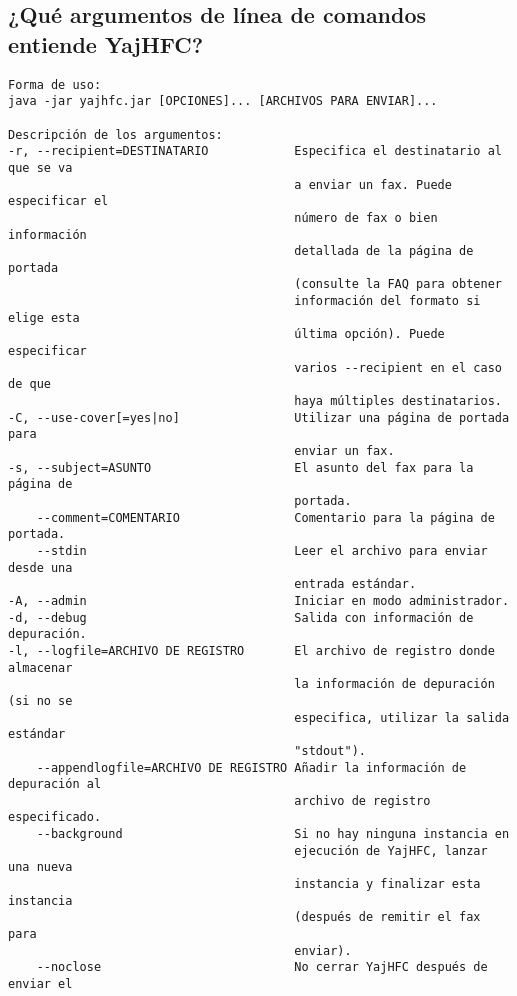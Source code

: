 \documentclass[a4paper,10pt]{scrartcl}
\begin{document}
\subsection{¿Qué argumentos de línea de comandos entiende YajHFC?}

\begin{verbatim}
Forma de uso:
java -jar yajhfc.jar [OPCIONES]... [ARCHIVOS PARA ENVIAR]...

Descripción de los argumentos:
-r, --recipient=DESTINATARIO            Especifica el destinatario al que se va
                                        a enviar un fax. Puede especificar el
                                        número de fax o bien información
                                        detallada de la página de portada
                                        (consulte la FAQ para obtener
                                        información del formato si elige esta
                                        última opción). Puede especificar
                                        varios --recipient en el caso de que
                                        haya múltiples destinatarios.
-C, --use-cover[=yes|no]                Utilizar una página de portada para
                                        enviar un fax.
-s, --subject=ASUNTO                    El asunto del fax para la página de
                                        portada.
    --comment=COMENTARIO                Comentario para la página de portada.
    --stdin                             Leer el archivo para enviar desde una
                                        entrada estándar.
-A, --admin                             Iniciar en modo administrador.
-d, --debug                             Salida con información de depuración.
-l, --logfile=ARCHIVO DE REGISTRO       El archivo de registro donde almacenar
                                        la información de depuración (si no se
                                        especifica, utilizar la salida estándar
                                        "stdout").
    --appendlogfile=ARCHIVO DE REGISTRO Añadir la información de depuración al
                                        archivo de registro especificado.
    --background                        Si no hay ninguna instancia en
                                        ejecución de YajHFC, lanzar una nueva
                                        instancia y finalizar esta instancia
                                        (después de remitir el fax para
                                        enviar).
    --noclose                           No cerrar YajHFC después de enviar el

\end{verbatim}
\end{document}
